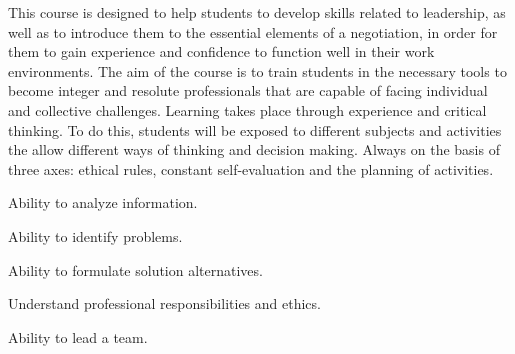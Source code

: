 \begin{syllabus}


\begin{justification}
This course is designed to help students to develop skills related to leadership, as well as to introduce them to the essential elements of a negotiation, in order for them to gain experience and confidence to function well in their work environments. The aim of the
course is to train students in the necessary tools to become integer and resolute professionals that are capable of facing individual and collective challenges. Learning takes place through experience and critical thinking. To do this, students will be exposed
to different subjects and activities the allow different ways of thinking and decision making. Always on the basis of three axes: ethical rules, constant self-evaluation and the planning of activities.
\end{justification}

\begin{goals}
\item Ability to analyze information.
\item Ability to identify problems.
\item Ability to formulate solution alternatives.
\item Understand professional responsibilities and ethics.
\item Ability to lead a team.
\end{goals}


\begin{outcomes}
    \item {} %
    \item {} %
    \item {} %
    \item {} %
    \item {} %
\end{outcomes}

\begin{competences}
    \item {}
    \item {}
    \item {}
    \item {}
\end{competences}


\end{syllabus}
